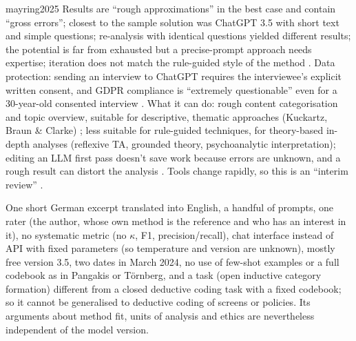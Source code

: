 \begin{papercard}{mayring2025}
 Results are ``rough approximations'' in the best case and contain ``gross errors''; closest to the sample solution was ChatGPT 3.5 with short text and simple questions; re-analysis with identical questions yielded different results; the potential is far from exhausted but a precise-prompt approach needs expertise; iteration does not match the rule-guided style of the method . Data protection: sending an interview to ChatGPT requires the interviewee's explicit written consent, and GDPR compliance is ``extremely questionable'' even for a 30-year-old consented interview . What it can do: rough content categorisation and topic overview, suitable for descriptive, thematic approaches (Kuckartz, Braun \& Clarke) ; less suitable for rule-guided techniques, for theory-based in-depth analyses (reflexive TA, grounded theory, psychoanalytic interpretation); editing an LLM first pass doesn't save work because errors are unknown, and a rough result can distort the analysis . Tools change rapidly, so this is an ``interim review'' .

 One short German excerpt translated into English, a handful of prompts, one rater (the author, whose own method is the reference and who has an interest in it), no systematic metric (no $\kappa$, F1, precision/recall), chat interface instead of API with fixed parameters (so temperature and version are unknown), mostly free version 3.5, two dates in March 2024, no use of few-shot examples or a full codebook as in Pangakis or Törnberg, and a task (open inductive category formation) different from a closed deductive coding task with a fixed codebook; so it cannot be generalised to deductive coding of screens or policies. Its arguments about method fit, units of analysis and ethics are nevertheless independent of the model version.


\end{papercard}
